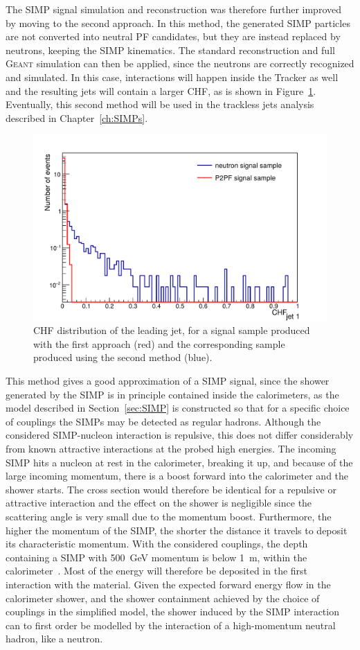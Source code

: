The \ac{SIMP} signal simulation and reconstruction was therefore further improved by moving to the second approach. In this method, the generated \ac{SIMP} particles are not converted into neutral \ac{PF} candidates, but they are instead replaced by neutrons, keeping the \ac{SIMP} kinematics. The standard reconstruction and full \textsc{Geant} simulation can then be applied, since the neutrons are correctly recognized and simulated. In this case, interactions will happen inside the Tracker as well and the resulting jets will contain a larger CHF, as is shown in Figure~\ref{fig:neutron_chf}. Eventually, this second method will be used in the trackless jets analysis described in Chapter~\ref{ch:SIMPs}.
 
\begin{figure}[ht]
  \centering
 \includegraphics[width=.75\textwidth]{ChF_neutrons.pdf} 
 \caption{CHF distribution of the leading jet, for a signal sample produced with the first approach (red) and the corresponding sample produced using the second method (blue).}
 \label{fig:neutron_chf}
\end{figure}

This method gives a good approximation of a \ac{SIMP} signal, since the shower generated by the \ac{SIMP} is in principle contained inside the calorimeters, as the model described in Section~\ref{sec:SIMP} is constructed so that for a specific choice of couplings the \acp{SIMP} may be detected as regular hadrons. Although the considered \ac{SIMP}-nucleon interaction is repulsive, this does not differ considerably from known attractive interactions at the probed high energies. The incoming \ac{SIMP} hits a nucleon at rest in the calorimeter, breaking it up, and because of the large incoming momentum, there is a boost forward into the calorimeter and the shower starts. The cross section would therefore be identical for a repulsive or attractive interaction and the effect on the shower is negligible since the scattering angle is very small due to the momentum boost. Furthermore, the higher the momentum of the \ac{SIMP}, the shorter the distance it travels to deposit its characteristic momentum. With the considered couplings, the depth containing a \ac{SIMP} with \SI{500}{GeV} momentum is below \SI{1}{m}, within the calorimeter~\cite{Bryan}. Most of the energy will therefore be deposited in the first interaction with the material. Given the expected forward energy flow in the calorimeter shower, and the shower containment achieved by the choice of couplings in the simplified model, the shower induced by the \ac{SIMP} interaction can to first order be modelled by the interaction of a high-momentum neutral hadron, like a neutron.

\clearpage
\clearpage{\pagestyle{empty}\cleardoublepage}
